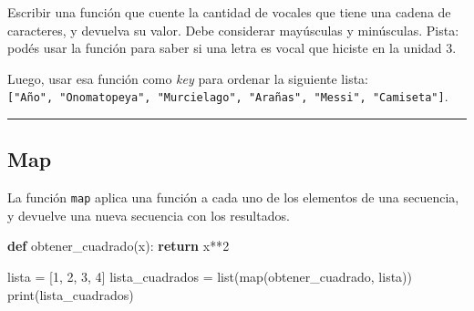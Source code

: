\documentclass[
  letterpaper,
  DIV=11,
  numbers=noendperiod]{scrreprt}
\newenvironment{Shaded}{\begin{snugshade}}{\end{snugshade}}
\newcommand{\BuiltInTok}[1]{\textcolor[rgb]{0.00,0.23,0.31}{#1}}
\newcommand{\ControlFlowTok}[1]{\textcolor[rgb]{0.00,0.23,0.31}{\textbf{#1}}}
\newcommand{\DecValTok}[1]{\textcolor[rgb]{0.68,0.00,0.00}{#1}}
\newcommand{\KeywordTok}[1]{\textcolor[rgb]{0.00,0.23,0.31}{\textbf{#1}}}
\newcommand{\NormalTok}[1]{\textcolor[rgb]{0.00,0.23,0.31}{#1}}
\newcommand{\OperatorTok}[1]{\textcolor[rgb]{0.37,0.37,0.37}{#1}}
\begin{document}
\begin{tcolorbox}[enhanced jigsaw, arc=.35mm, toptitle=1mm, colframe=quarto-callout-important-color-frame, bottomtitle=1mm, opacitybacktitle=0.6, colbacktitle=quarto-callout-important-color!10!white, leftrule=.75mm, coltitle=black, toprule=.15mm, titlerule=0mm, title=\textcolor{quarto-callout-important-color}{\faExclamation}\hspace{0.5em}{Ejercicio Desafío}, bottomrule=.15mm, rightrule=.15mm, colback=white, breakable, opacityback=0, left=2mm]

Escribir una función que cuente la cantidad de vocales que tiene una
cadena de caracteres, y devuelva su valor. Debe considerar mayúsculas y
minúsculas. Pista: podés usar la función para saber si una letra es
vocal que hiciste en la unidad 3.

Luego, usar esa función como \emph{key} para ordenar la siguiente lista:
\texttt{{[}"Año",\ "Onomatopeya",\ "Murcielago",\ "Arañas",\ "Messi",\ "Camiseta"{]}}.\\

\end{tcolorbox}

\hfill\break

\begin{center}\rule{0.5\linewidth}{0.5pt}\end{center}

\hfill\break

\subsection{Map}\label{map}

La función \texttt{map} aplica una función a cada uno de los elementos
de una secuencia, y devuelve una nueva secuencia con los resultados.

\begin{Shaded}
\begin{Highlighting}[]
\KeywordTok{def}\NormalTok{ obtener\_cuadrado(x):}
  \ControlFlowTok{return}\NormalTok{ x}\OperatorTok{**}\DecValTok{2}

\NormalTok{lista }\OperatorTok{=}\NormalTok{ [}\DecValTok{1}\NormalTok{, }\DecValTok{2}\NormalTok{, }\DecValTok{3}\NormalTok{, }\DecValTok{4}\NormalTok{]}
\NormalTok{lista\_cuadrados }\OperatorTok{=} \BuiltInTok{list}\NormalTok{(}\BuiltInTok{map}\NormalTok{(obtener\_cuadrado, lista))}
\BuiltInTok{print}\NormalTok{(lista\_cuadrados)}
\end{Highlighting}
\end{Shaded}
\end{document}
